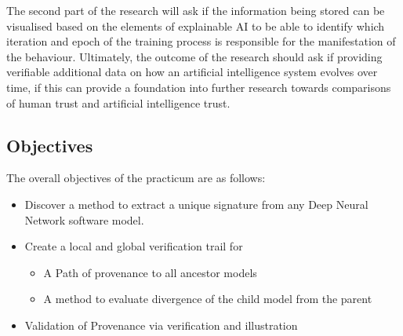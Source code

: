  The second part of the research will ask if the
information being stored can be visualised based on the elements of explainable
AI to be able to identify which iteration and epoch of the training process is
responsible for the manifestation of the behaviour. Ultimately, the outcome of
the research should ask if providing verifiable additional data on how an
artificial intelligence system evolves over time, if this can provide a
foundation into further research towards comparisons of human trust and
artificial intelligence trust.


\subsection{Objectives}
The overall objectives of the practicum are as follows:

\begin{itemize}
    \item Discover a method to extract a unique signature from any Deep Neural Network software model.
    \item Create a local and global verification trail for
    \begin{itemize}
        \item A Path of provenance to all ancestor models
        \item A method to evaluate divergence of the child model from the parent
    \end{itemize}
    \item Validation of Provenance via verification and illustration
\end{itemize}